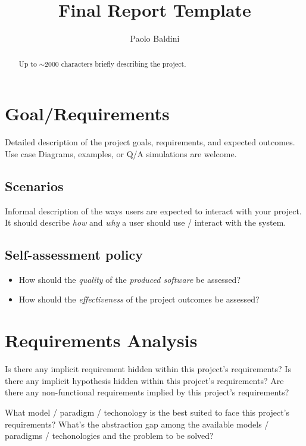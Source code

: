 \documentclass{scrartcl}
\title{\LARGE
    Final Report Template
}
\author{
    Paolo Baldini \\ \emailaddr{paolo.baldini6@studio.unibo.it}
}
\begin{document}
\maketitle

\begin{abstract}
    Up to $\sim$2000 characters briefly describing the project.
\end{abstract}

\section{Goal/Requirements}

Detailed description of the project goals, requirements, and expected outcomes.
%
Use case Diagrams, examples, or Q/A simulations are welcome.

\subsection{Scenarios}

Informal description of the ways users are expected to interact with your project.
%
It should describe \emph{how} and \emph{why} a user should use / interact with the system.

\subsection{Self-assessment policy}

\begin{itemize}
    \item How should the \emph{quality} of the \emph{produced software} be assessed?
    
    \item How should the \emph{effectiveness} of the project outcomes be assessed?
\end{itemize}

\section{Requirements Analysis}

Is there any implicit requirement hidden within this project's requirements?
%
Is there any implicit hypothesis hidden within this project's requirements?
%
Are there any non-functional requirements implied by this project's requirements?

What model / paradigm / techonology is the best suited to face this project's requirements?
%
What's the abstraction gap among the available models / paradigms / techonologies and the problem to be solved?
\end{document}
